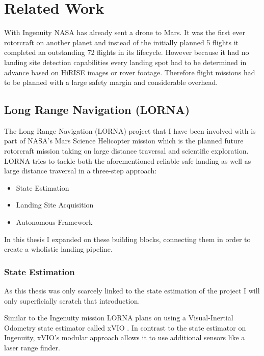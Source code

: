 \chapter{Related Work}
\label{sec:relwork}

With Ingenuity\citep{Ingenuity} NASA has already sent a drone to Mars. It was the first ever rotorcraft on another planet and instead of the initially planned 5 flights it completed an outstanding 72 flights in its lifecycle. However because it had no landing site detection capabilities every landing spot had to be determined in advance based on HiRISE images or rover footage. Therefore flight missions had to be planned with a large safety margin and considerable overhead. 


\section{Long Range Navigation (LORNA)}

The Long Range Navigation (LORNA) project that I have been involved with is part of NASA's Mars Science Helicopter mission which is the planned future rotorcraft mission taking on large distance traversal and scientific exploration. LORNA tries to tackle both the aforementioned reliable safe landing as well as large distance traversal in a three-step approach:

\begin{itemize}
    \item State Estimation \citep{XVIO, XMBL}
    \item Landing Site Acquisition \citep{LSDnSFM}
    \item Autonomous Framework \citep{Autonomy}
\end{itemize}

In this thesis I expanded on these building blocks, connecting them in order to create a wholistic landing pipeline.

\subsection{State Estimation}\label{sec:state_estimator}

As this thesis was only scarcely linked to the state estimation of the project I will only superficially scratch that introduction. 

Similar to the Ingenuity mission LORNA plans on using a Visual-Inertial Odometry state estimator called xVIO \citep{XVIO}. In contrast to the state estimator on Ingenuity, xVIO's modular approach allows it to use additional sensors like a laser range finder.

